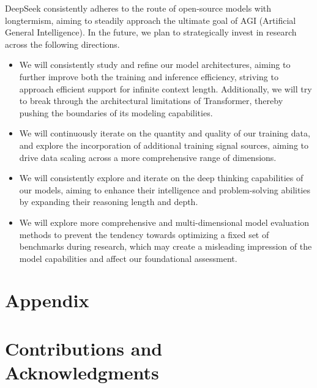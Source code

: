 \documentclass[11pt, a4paper, logo, copyright, nonumbering]{deepseek}
\begin{document}
\begin{CJK*}{UTF8}{gbsn}
DeepSeek consistently adheres to the route of open-source models with longtermism, aiming to steadily approach the ultimate goal of AGI (Artificial General Intelligence).
In the future, we plan to strategically invest in research across the following directions.
\begin{itemize}
    \item 
    We will consistently study and refine our model architectures, aiming to further improve both the training and inference efficiency, striving to approach efficient support for infinite context length. 
    Additionally, we will try to break through the architectural limitations of Transformer, thereby pushing the boundaries of its modeling capabilities.
    \item 
    We will continuously iterate on the quantity and quality of our training data, and explore the incorporation of additional training signal sources, aiming to drive data scaling across a more comprehensive range of dimensions.
    \item 
    We will consistently explore and iterate on the deep thinking capabilities of our models, aiming to enhance their intelligence and problem-solving abilities by expanding their reasoning length and depth.
    \item 
    We will explore more comprehensive and multi-dimensional model evaluation methods to prevent the tendency towards optimizing a fixed set of benchmarks during research, which may create a misleading impression of the model capabilities and affect our foundational assessment.
\end{itemize}



\newpage
\appendix

\section*{Appendix}

\section{Contributions and Acknowledgments}



\end{CJK*}
\end{document}
